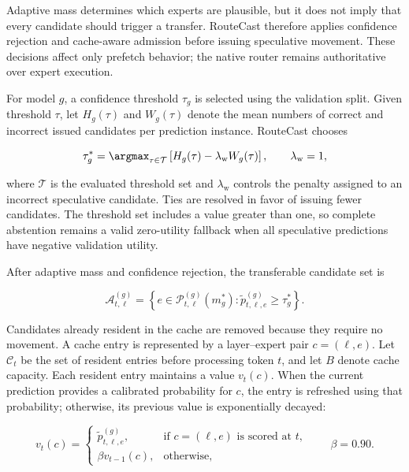 \documentclass[conference]{IEEEtran}
\begin{document}
Adaptive mass determines which experts are plausible, but it does not imply
that every candidate should trigger a transfer. RouteCast therefore applies
confidence rejection and cache-aware admission before issuing speculative
movement. These decisions affect only prefetch behavior; the native router
remains authoritative over expert execution.

For model \(g\), a confidence threshold \(\tau_g\) is selected using the
validation split. Given threshold \(\tau\), let \(H_g(\tau)\) and
\(W_g(\tau)\) denote the mean numbers of correct and incorrect issued
candidates per prediction instance. RouteCast chooses

\begin{equation}
\tau_g^*
=
\argmax_{\tau\in\mathcal{T}}
\left[
H_g(\tau)
-
\lambda_{\mathrm{w}}W_g(\tau)
\right],
\qquad
\lambda_{\mathrm{w}}=1,
\label{eq:abstention-threshold}
\end{equation}

where \(\mathcal{T}\) is the evaluated threshold set and
\(\lambda_{\mathrm{w}}\) controls the penalty assigned to an incorrect
speculative candidate. Ties are resolved in favor of issuing fewer
candidates. The threshold set includes a value greater than one, so complete
abstention remains a valid zero-utility fallback when all speculative
predictions have negative validation utility.

After adaptive mass and confidence rejection, the transferable candidate set
is

\begin{equation}
\mathcal{A}_{t,\ell}^{(g)}
=
\left\{
e\in
\mathcal{P}_{t,\ell}^{(g)}(m_g^*):
\widetilde{p}_{t,\ell,e}^{(g)}
\geq\tau_g^*
\right\}.
\label{eq:confidence-filter}
\end{equation}

Candidates already resident in the cache are removed because they require no
movement. A cache entry is represented by a layer--expert pair
\(c=(\ell,e)\). Let \(\mathcal{C}_t\) be the set of resident entries before
processing token \(t\), and let \(B\) denote cache capacity. Each resident
entry maintains a value \(v_t(c)\). When the current prediction provides a
calibrated probability for \(c\), the entry is refreshed using that
probability; otherwise, its previous value is exponentially decayed:

\begin{equation}
v_t(c)
=
\begin{cases}
\widetilde{p}_{t,\ell,e}^{(g)},
& \text{if \(c=(\ell,e)\) is scored at \(t\)}, \\[2pt]
\beta v_{t-1}(c),
& \text{otherwise},
\end{cases}
\qquad
\beta=0.90.
\label{eq:cache-value}
\end{equation}
\end{document}
